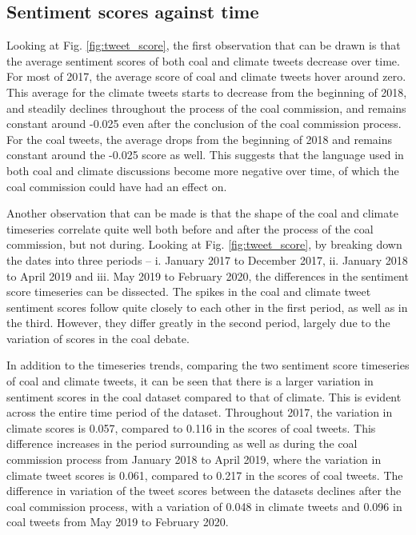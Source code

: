 \documentclass[12pt,onecolumn,twoside]{layout}
\begin{document}
\subsection*{Sentiment scores against time} 
Looking at Fig. \ref{fig:tweet_score}, the first observation that can be drawn is that the average sentiment scores of both coal and climate tweets decrease over time. For most of 2017, the average score of coal and climate tweets hover around zero. This average for the climate tweets starts to decrease from the beginning of 2018, and steadily declines throughout the process of the coal commission, and remains constant around -0.025 even after the conclusion of the coal commission process. For the coal tweets, the average drops from the beginning of 2018 and remains constant around the -0.025 score as well. This suggests that the language used in both coal and climate discussions become more negative over time, of which the coal commission could have had an effect on. 

Another observation that can be made is that the shape of the coal and climate timeseries correlate quite well both before and after the process of the coal commission, but not during. Looking at Fig. \ref{fig:tweet_score}, by breaking down the dates into three periods -- i. January 2017 to December 2017, ii. January 2018 to April 2019 and iii. May 2019 to February 2020, the differences in the sentiment score timeseries can be dissected. The spikes in the coal and climate tweet sentiment scores follow quite closely to each other in the first period, as well as in the third. However, they differ greatly in the second period, largely due to the variation of scores in the coal debate. %

In addition to the timeseries trends, comparing the two sentiment score timeseries of coal and climate tweets, it can be seen that there is a larger variation in sentiment scores in the coal dataset compared to that of climate. This is evident across the entire time period of the dataset. Throughout 2017, the variation in climate scores is 0.057, compared to 0.116 in the scores of coal tweets. This difference increases in the period surrounding as well as during the coal commission process from January 2018 to April 2019, where the variation in climate tweet scores is 0.061, compared to 0.217 in the scores of coal tweets. The difference in variation of the tweet scores between the datasets declines after the coal commission process, with a variation of 0.048 in climate tweets and 0.096 in coal tweets from May 2019 to February 2020. %
\end{document}
